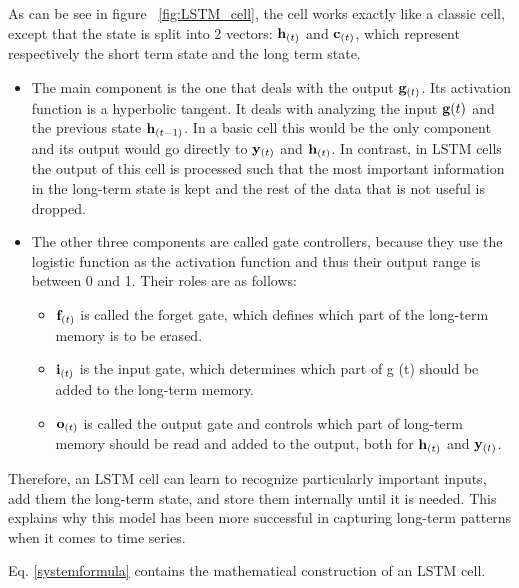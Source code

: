 \documentclass[10pt]{article} %
\begin{document}
As can be see in figure ~\ref{fig:LSTM_cell}, the cell works exactly like a classic cell, except that the state is split into 2 vectors: ${\bf h}_{(t)}$ and ${\bf c}_{(t)}$, which represent respectively the short term state and the long term state.
\begin{itemize}
    \item The main component is the one that deals with the output ${\bf g}_{(t)}$. Its activation function is a hyperbolic tangent. It deals with analyzing the input ${\bf g} {(t)}$ and the previous state ${\bf h}_{(t-1)}$. In a basic cell this would be the only component and its output would go directly to ${\bf y }_{(t)}$ and ${\bf h} _{(t)}$. In contrast, in LSTM cells the output of this cell is processed such that the most important information in the long-term state is kept and the rest of the data that is not useful is dropped. 
    \item
        The other three components are called gate controllers, because they use the logistic function as the activation function and thus their output range is between 0 and 1. Their roles are as follows: 
        \begin{itemize}
            \item ${\bf f}_{(t)}$ is called the forget gate, which defines which part of the long-term memory is to be erased. 
            \item ${\bf i}_{(t)}$ is the input gate, which determines which part of g (t) should be added to the long-term memory.
            \item ${\bf o}_{(t)}$ is called the output gate and controls which part of long-term memory should be read and added to the output, both for ${\bf h}_{(t)}$ and ${\bf y}_{(t)}$.
        \end{itemize}
\end{itemize}


Therefore, an LSTM cell can learn to recognize particularly important inputs, add them the long-term state, and store them internally until it is needed. This explains why this model has been more successful in capturing long-term patterns when it comes to time series.

 Eq. \eqref{systemformula} contains the mathematical construction of an LSTM cell.
\end{document}
